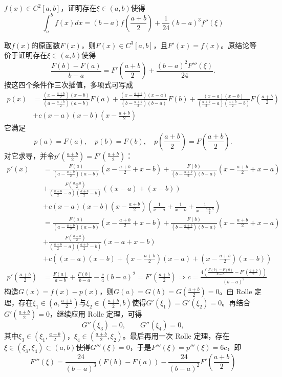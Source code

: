 \begin{example}[$\int_a^bf\left(x\right)dx=\left(b-a\right)f\left(\frac{a+b}{2}\right)+\frac{1}{24}\left(b-a\right)^3f''\left(\xi\right)$]
$f(x)\in C^2[a,b]$，证明存在$\xi\in(a,b)$使得\[\int_a^bf\left(x\right)dx=\left(b-a\right)f\left(\frac{a+b}{2}\right)+\frac{1}{24}\left(b-a\right)^3f''\left(\xi\right)\]
\end{example}
\begin{solution}
取$f(x)$的原函数$F(x)$，则$F(x)\in C^3[a,b]$，且$F'(x)=f(x)$。原结论等价于证明存在$\xi\in(a,b)$使得
\[
\frac{F(b)-F(a)}{b-a}=F'\left(\frac{a+b}{2}\right)+\frac{(b-a)^2F'''(\xi)}{24}.
\]
按这四个条件作三次插值，多项式可写成
\begin{align*}
p(x)&=\frac{(x-\frac{a+b}{2})(x-b)}{(a-\frac{a+b}{2})(a-b)}F(a)+\frac{(x-\frac{a+b}{2})(x-a)}{(b-\frac{a+b}{2})(b-a)}F(b)+\frac{(x-a)(x-b)}{(\frac{a+b}{2}-a)(\frac{a+b}{2}-b)}F\left(\frac{a+b}{2}\right)\\&+c(x-a)(x-b)\left(x-\frac{a+b}2\right)
\end{align*}
它满足
\[
p(a)=F(a),\quad p(b)=F(b),\quad p\left(\frac{a+b}2\right)=F\left(\frac{a+b}2\right).
\]
对它求导，并令$p'\left(\frac{a+b}2\right)=F'\left(\frac{a+b}2\right)$：
\begin{align*}
p'(x)&=\frac{F(a)}{(a-\frac{a+b}{2})(a-b)}\left(x-\frac{a+b}{2}+x-b\right)+\frac{F(b)}{(b-\frac{a+b}{2})(b-a)}\left(x-\frac{a+b}{2}+x-a\right)\\&+\frac{F\left(\frac{a+b}{2}\right)}{(\frac{a+b}{2}-a)(\frac{a+b}{2}-b)}\left((x-a)+(x-b)\right)\\
&+c(x-a)(x-b)\left(x-\frac{a+b}2\right)\left(\frac{1}{x-a}+\frac{1}{x-b}+\frac{1}{x-\frac{a+b}2}\right)\\
&=\frac{F(a)}{(a-\frac{a+b}{2})(a-b)}\left(x-\frac{a+b}{2}+x-b\right)+\frac{F(b)}{(b-\frac{a+b}{2})(b-a)}\left(x-\frac{a+b}{2}+x-a\right)\\&+\frac{F\left(\frac{a+b}{2}\right)}{(\frac{a+b}{2}-a)(\frac{a+b}{2}-b)}\left(x-a+x-b\right)\\
&+c\left((x-a)(x-b)+\left(x-\frac{a+b}{2}\right)(x-a)+\left(x-\frac{a+b}{2}\right)(x-b)\right)\\
p'\left(\frac{a+b}2\right)&=\frac{F(a)}{a-b}+\frac{F(b)}{b-a}-\frac{c}{4}(b-a)^2=F'\left(\frac{a+b}2\right)\Rightarrow c=\frac{4\left(\frac{F(b)-F(a)}{b-a}-F'\left(\frac{a+b}2\right)\right)}{(b-a)^2}
\end{align*}
构造$G(x)=f(x)-p(x)$，则$G(a)=G(b)=G\left(\frac{a+b}2\right)=0$。由 Rolle 定理，存在$\xi_1\in(a,\frac{a+b}2)$与$\xi_2\in(\frac{a+b}2,b)$使得$G'(\xi_1)=G'(\xi_2)=0$。再结合$G'\left(\frac{a+b}2\right)=0$，继续应用 Rolle 定理，可得
\[
G''(\xi_3)=0,\qquad G''(\xi_4)=0,
\]
其中$\xi_3\in(\xi_1,\frac{a+b}2)$，$\xi_4\in(\frac{a+b}2,\xi_2)$。最后再用一次 Rolle 定理，存在$\xi\in(\xi_3,\xi_4)\subset(a,b)$使得$G'''(\xi)=0$，于是$F'''(\xi)=p'''(\xi)=6c$，即
\[F'''(\xi)=\frac{24}{(b-a)^3}(F(b)-F(a))-\frac{24}{(b-a)^2}F'\left(\frac{a+b}2\right)\]
\end{solution}

